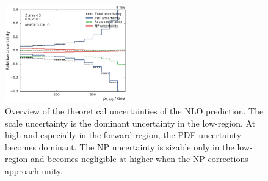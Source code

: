 \begin{figure}[htp]
    \includegraphics[width=0.47\textwidth]{figures/theory/theo_unc_overview_yb2ys0.pdf}
    \caption[Overview of theoretical uncertainties]{Overview of the theoretical uncertainties of the NLO prediction.
    The scale uncertainty is the dominant uncertainty in the low-\pt region. At
    high-\pt and especially in the forward region, the PDF uncertainty becomes
    dominant. The NP uncertainty is sizable only in the low-\pt region and becomes
    negligible at higher \pt when the NP corrections approach unity.}
    \label{fig:theo_uncertainties}
\end{figure}
